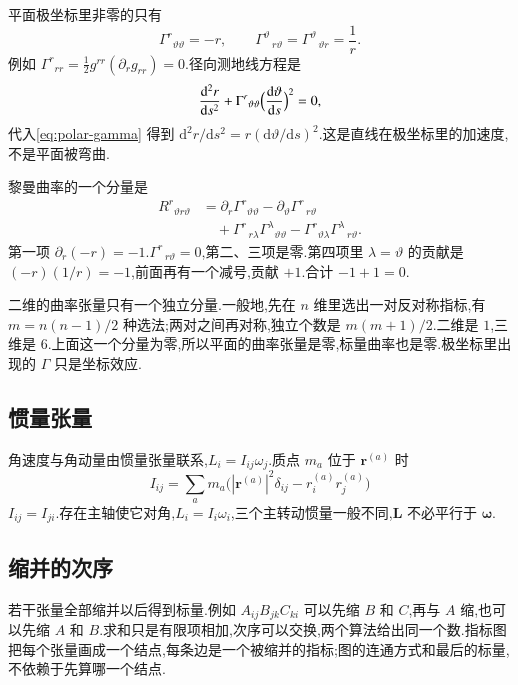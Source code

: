 平面极坐标里非零的只有
\begin{equation}
  \Gamma^r{}_{\vartheta\vartheta}=-r,
  \qquad
  \Gamma^\vartheta{}_{\,r\vartheta}
  =\Gamma^\vartheta{}_{\,\vartheta r}=\frac1r.
  \label{eq:polar-gamma}
\end{equation}
例如 $\Gamma^r{}_{rr}=\frac12 g^{rr}(\partial_r g_{rr})=0$.径向测地线方程是
\begin{equation}
  \frac{\mathrm{d}^2 r}{\mathrm{d}s^2}
  +\Gamma^r{}_{\vartheta\vartheta}
  \Bigl(\frac{\mathrm{d}\vartheta}{\mathrm{d}s}\Bigr)^2=0,
\end{equation}
代入\eqref{eq:polar-gamma} 得到 $\mathrm{d}^2 r/\mathrm{d}s^2=r(\mathrm{d}\vartheta/\mathrm{d}s)^2$.这是直线在极坐标里的加速度,不是平面被弯曲.

黎曼曲率的一个分量是
\begin{equation}
\begin{aligned}
  R^r{}_{\vartheta r\vartheta}
  &=\partial_r\Gamma^r{}_{\vartheta\vartheta}
   -\partial_\vartheta\Gamma^r{}_{\,r\vartheta} \\
  &\quad
   +\Gamma^r{}_{\,r\lambda}\Gamma^\lambda{}_{\vartheta\vartheta}
   -\Gamma^r{}_{\vartheta\lambda}\Gamma^\lambda{}_{\,r\vartheta}.
\end{aligned}
\end{equation}
第一项 $\partial_r(-r)=-1$.$\Gamma^r{}_{\,r\vartheta}=0$,第二、三项是零.第四项里 $\lambda=\vartheta$ 的贡献是 $(-r)(1/r)=-1$,前面再有一个减号,贡献 $+1$.合计 $-1+1=0$.

二维的曲率张量只有一个独立分量.一般地,先在 $n$ 维里选出一对反对称指标,有 $m=n(n-1)/2$ 种选法;两对之间再对称,独立个数是 $m(m+1)/2$.二维是 $1$,三维是 $6$.上面这一个分量为零,所以平面的曲率张量是零,标量曲率也是零.极坐标里出现的 $\Gamma$ 只是坐标效应.

\subsection{惯量张量}
角速度与角动量由惯量张量联系,$L_i=I_{ij}\omega_j$.质点 $m_a$ 位于 $\mathbf{r}^{(a)}$ 时
\begin{equation}
  I_{ij}
  =\sum_a m_a
    \bigl(
      |\mathbf{r}^{(a)}|^2\delta_{ij}
      -r^{(a)}_i r^{(a)}_j
    \bigr)
\end{equation}
$I_{ij}=I_{ji}$.存在主轴使它对角,$L_i=I_i\omega_i$,三个主转动惯量一般不同,$\mathbf{L}$ 不必平行于 $\boldsymbol{\omega}$.

\subsection{缩并的次序}
若干张量全部缩并以后得到标量.例如 $A_{ij}B_{jk}C_{ki}$ 可以先缩 $B$ 和 $C$,再与 $A$ 缩,也可以先缩 $A$ 和 $B$.求和只是有限项相加,次序可以交换,两个算法给出同一个数.指标图把每个张量画成一个结点,每条边是一个被缩并的指标;图的连通方式和最后的标量,不依赖于先算哪一个结点.

